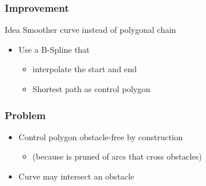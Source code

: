 \begin{frame}
  \frametitle{Improvement}
  \begin{block}{Idea}
    \alert{Smoother} curve instead of polygonal chain
  \end{block}
  \pause
  \begin{itemize}
  \item Use a \alert{B-Spline} that \pause
    \begin{itemize}
    \item \alert{interpolate} the start and end\pause
    \item Shortest path as \alert{control polygon}
    \end{itemize}
  \end{itemize}
\end{frame}

\begin{frame}
  \frametitle{Problem}  
  \begin{itemize}
  \item \alert{Control polygon} obstacle-free by
    construction\pause
    \begin{itemize}
    \item (because is pruned of arcs that cross obstacles)\pause
    \end{itemize}
  \item \alert{Curve} may intersect an obstacle\pause
  \end{itemize}
  \begin{center}
  \end{center}
\end{frame}

